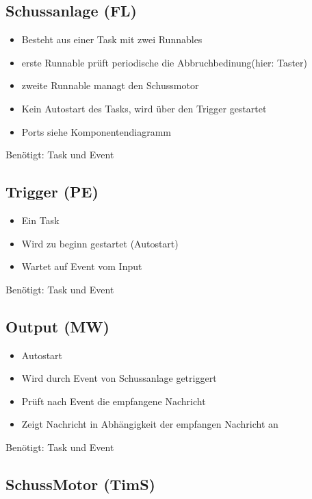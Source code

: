 \documentclass[a4paper,11pt]{scrreprt}
\begin{document}
\subsection*{Schussanlage (FL)}

\begin{itemize}
	\item Besteht aus einer Task mit zwei Runnables
	\item erste Runnable prüft periodische die Abbruchbedinung(hier: Taster)
	\item zweite Runnable managt den Schussmotor
	\item Kein Autostart des Tasks, wird über den Trigger gestartet
	\item Ports siehe Komponentendiagramm
\end{itemize}

Benötigt: Task und Event

\subsection*{Trigger (PE)}

\begin{itemize}
 \item Ein Task
 \item Wird zu beginn gestartet (Autostart)
 \item Wartet auf Event vom Input
\end{itemize}

Benötigt: Task und Event

\subsection*{Output (MW)}

\begin{itemize}
 \item Autostart
 \item Wird durch Event von Schussanlage getriggert
 \item Prüft nach Event die empfangene Nachricht
 \item Zeigt Nachricht in Abhängigkeit der empfangen Nachricht an
\end{itemize}

Benötigt: Task und Event


\subsection*{SchussMotor (TimS)}
\end{document}
